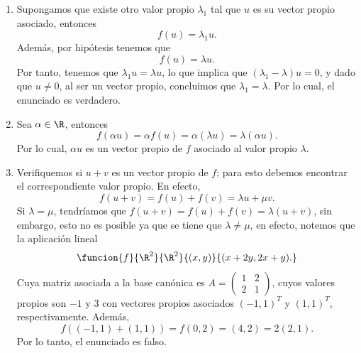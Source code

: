 \documentclass[10pt,a4]{examenEPN}
\begin{document}
\begin{preguntas}
\begin{respuesta}\hspace{0pt}

\begin{enumerate}
    \item Supongamos que existe otro valor propio $\lambda_{1}$ tal que $u$ es su vector propio asociado, entonces
    \[
        f(u) = \lambda_{1}u.
    \]
    Además, por hipótesis tenemos que
    \[
        f(u) = \lambda u.
    \]
    Por tanto, tenemos que $\lambda_{1}u=\lambda u$, lo que implica que $(\lambda_{1}-\lambda)u=0$, y dado que $u\neq0$, al ser un vector propio, concluimos que $\lambda_{1}=\lambda$. Por lo cual, el enunciado es verdadero.
    \item Sea $\alpha\in\R$, entonces
    \[
        f(\alpha u) = \alpha f(u) = \alpha (\lambda u) = \lambda (\alpha u).
    \]
    Por lo cual, $\alpha u$ es un vector propio de $f$ asociado al valor propio $\lambda$.
    \item Verifiquemos si $u+v$ es un vector propio de $f$; para esto debemos encontrar el correspondiente valor propio. En efecto,
    \[
        f(u + v) = f(u) + f(v) = \lambda u + \mu v.
    \]
    Si $\lambda = \mu$, tendríamos que $f(u + v) = f(u) + f(v) = \lambda(u+v)$, sin embargo, esto no es posible ya que se tiene que  $\lambda\neq\mu$, en efecto, notemos que la aplicación lineal
    \[
        \funcion{f}{\R^{2}}{\R^{2}}{(x,y)}{(x+2y,2x+y).}
    \]
    Cuya matriz asociada a la base canónica es $A = \begin{pmatrix}1&2\\2&1\end{pmatrix}$, cuyos valores propios son $-1$ y 3 con vectores propios asociados $(-1,1)^{T}$ y $(1,1)^{T}$, respectivamente. Además,
    \[
        f((-1,1)+(1,1))=f(0,2)=(4,2)=2(2,1).
    \]
    Por lo tanto, el enunciado es falso.\qedhere
\end{enumerate}
\end{respuesta}
    


\end{preguntas}
\end{document}
